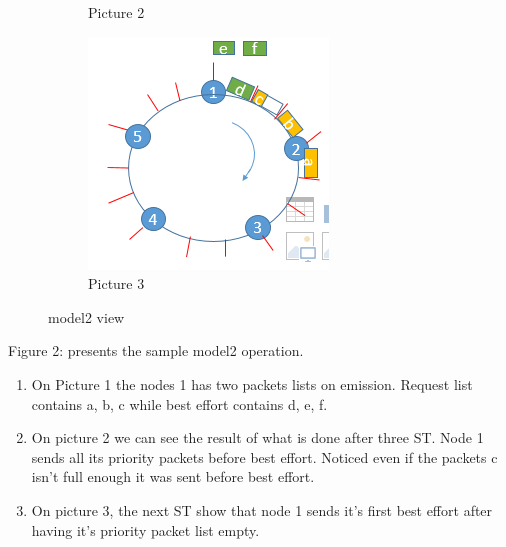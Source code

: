 \documentclass{article}
\begin{document}
\begin{figure}
\begin{subfigure}[b]{0.3\textwidth}
    \caption{Picture 2}
    \label{fig:2}
  \end{subfigure}
%
  \begin{subfigure}[b]{0.3\textwidth}
    \includegraphics[width=\textwidth]{model23.png}
    \caption{Picture 3}
    \label{fig:3}
  \end{subfigure}
\caption{ model2 view}
\end{figure}

Figure 2: presents the sample model2 operation.
\begin{enumerate}[label=$\bullet$]
\item On Picture 1 the nodes 1 has two packets lists on emission. Request list contains a, b, c while best effort contains d, e, f.    
\item On picture 2 we can see the result of what is done after three ST. Node 1 sends all its priority packets before best effort. Noticed even if the packets c isn't full enough it was sent before best effort.
\item On picture 3, the next ST show that node 1 sends it's first best effort after having it's priority packet list empty.
\end{enumerate}
\end{document}
